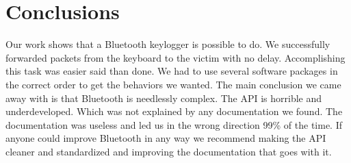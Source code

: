 \documentclass{acm_proc_article-sp}
\begin{document}
\section{Conclusions}
Our work shows that a Bluetooth keylogger is possible to do. We successfully forwarded packets from the keyboard to the victim with no delay. Accomplishing this task was easier said than done. We had to use several software packages in the correct order to get the behaviors we wanted. The main conclusion we came away with is that Bluetooth is needlessly complex. The API is horrible and underdeveloped. Which was not explained by any documentation we found. The documentation was useless and led us in the wrong direction 99\% of the time. If anyone could improve Bluetooth in any way we recommend making the API cleaner and standardized and improving the documentation that goes with it.

%


\balancecolumns
\end{document}
